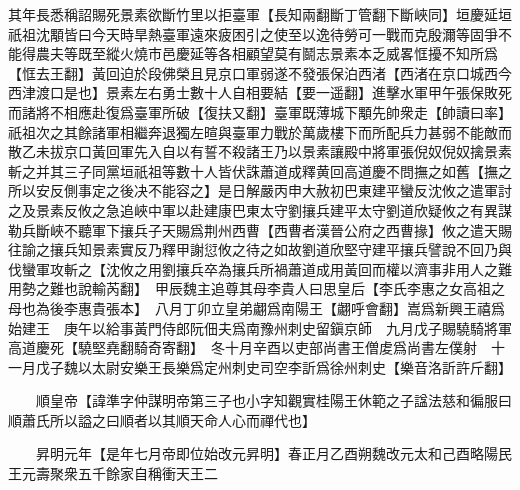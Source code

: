 其年長悉稱詔賜死景素欲斷竹里以拒臺軍【長知兩翻斷丁管翻下斷峽同】垣慶延垣祇祖沈顒皆曰今天時旱熱臺軍遠來疲困引之使至以逸待勞可一戰而克殷濔等固爭不能得農夫等既至縱火燒市邑慶延等各相顧望莫有鬬志景素本乏威畧恇擾不知所爲【恇去王翻】黃回迫於段佛榮且見京口軍弱遂不發張保泊西渚【西渚在京口城西今西津渡口是也】景素左右勇士數十人自相要結【要一遥翻】進擊水軍甲午張保敗死而諸將不相應赴復爲臺軍所破【復扶又翻】臺軍既薄城下顒先帥衆走【帥讀曰率】祇祖次之其餘諸軍相繼奔退獨左暄與臺軍力戰於萬歲樓下而所配兵力甚弱不能敵而散乙未拔京口黃回軍先入自以有誓不殺諸王乃以景素讓殿中將軍張倪奴倪奴擒景素斬之并其三子同黨垣祇祖等數十人皆伏誅蕭道成釋黄回高道慶不問撫之如舊【撫之所以安反側事定之後决不能容之】是日解嚴丙申大赦初巴東建平蠻反沈攸之遣軍討之及景素反攸之急追峽中軍以赴建康巴東太守劉攘兵建平太守劉道欣疑攸之有異謀勒兵斷峽不聽軍下攘兵子天賜爲荆州西曹【西曹者漢晉公府之西曹掾】攸之遣天賜往諭之攘兵知景素實反乃釋甲謝愆攸之待之如故劉道欣堅守建平攘兵譬說不回乃與伐蠻軍攻斬之【沈攸之用劉攘兵卒為攘兵所禍蕭道成用黃回而權以濟事非用人之難用勢之難也說輸芮翻】　甲辰魏主追尊其母李貴人曰思皇后【李氏李惠之女高祖之母也為後李惠貴張本】　八月丁卯立皇弟翽爲南陽王【翽呼會翻】嵩爲新興王禧爲始建王　庚午以給事黃門侍郎阮佃夫爲南豫州刺史留鎭京師　九月戊子賜驍騎將軍高道慶死【驍堅堯翻騎奇寄翻】　冬十月辛酉以吏部尚書王僧䖍爲尚書左僕射　十一月戊子魏以太尉安樂王長樂爲定州刺史司空李訢爲徐州刺史【樂音洛訢許斤翻】

　　順皇帝【諱準字仲謀明帝第三子也小字知觀實桂陽王休範之子諡法慈和徧服曰順蕭氏所以謚之曰順者以其順天命人心而禪代也】

　　昇明元年【是年七月帝即位始改元昇明】春正月乙酉朔魏改元太和己酉略陽民王元壽聚衆五千餘家自稱衝天王二

